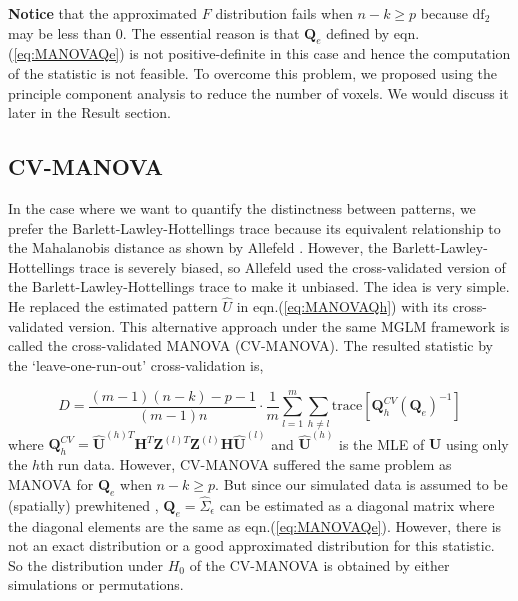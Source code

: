 \documentclass[english]{article}\usepackage[]{graphicx}\usepackage[]{color}
\begin{document}
\textbf{Notice} that the approximated $F$ distribution fails when
$n-k\ge p$ because $\text{df}_{2}$ may be less than $0$. The essential
reason is that $\boldsymbol{Q}_{e}$ defined by eqn.(\ref{eq:MANOVAQe})
is not positive-definite in this case and hence the computation of
the statistic is not feasible. To overcome this problem, we proposed
using the principle component analysis to reduce the number of voxels.
We would discuss it later in the Result section. 


\subsection{CV-MANOVA}

In the case where we want to quantify the distinctness between patterns,
we prefer the Barlett-Lawley-Hottellings trace because its equivalent
relationship to the Mahalanobis distance as shown by Allefeld \cite{allefeld2014searchlight}.
However, the Barlett-Lawley-Hottellings trace is severely biased,
so Allefeld used the cross-validated version of the Barlett-Lawley-Hottellings
trace to make it unbiased. The idea is very simple. He replaced the
estimated pattern $\hat{U}$ in eqn.(\ref{eq:MANOVAQh}) with its
cross-validated version. This alternative approach under the same
MGLM framework is called the cross-validated MANOVA (CV-MANOVA). The
resulted statistic by the \textquoteleft leave-one-run-out\textquoteright{}
cross-validation is,

\begin{equation}
D=\frac{(m-1)\left(n-k\right)-p-1}{(m-1)n}\cdot\frac{1}{m}\sum_{l=1}^{m}\sum_{h\neq l}\text{trace}\left[\boldsymbol{Q}_{h}^{CV}\left(\boldsymbol{Q}_{e}\right)^{-1}\right]\label{eq:CVMANOVA}
\end{equation}
where $\boldsymbol{Q}_{h}^{CV}=\hat{\boldsymbol{U}}^{(h)T}\boldsymbol{H}^{T}\boldsymbol{Z}^{(l)T}\boldsymbol{Z}^{(l)}\boldsymbol{H}\hat{\boldsymbol{U}}^{(l)}$
and $\hat{\boldsymbol{U}}^{(h)}$ is the MLE of $\boldsymbol{\boldsymbol{U}}$
using only the $h$th run data. However, CV-MANOVA suffered the same
problem as MANOVA for $\boldsymbol{Q}_{e}$ when $n-k\ge p$. But
since our simulated data is assumed to be (spatially) prewhitened
, $\boldsymbol{Q}_{e}=\hat{\Sigma}_{\epsilon}$ can be estimated as
a diagonal matrix where the diagonal elements are the same as eqn.(\ref{eq:MANOVAQe}).
However, there is not an exact distribution or a good approximated
distribution for this statistic. So the distribution under $H_{0}$
of the CV-MANOVA is obtained by either simulations or permutations. 
\end{document}
